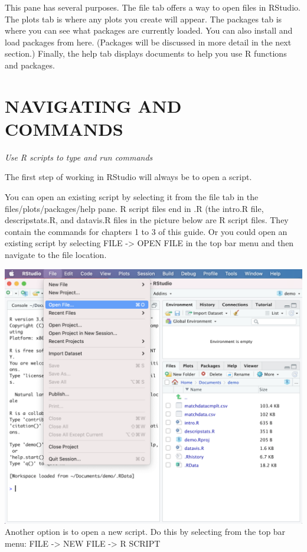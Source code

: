 \documentclass[
]{book}
\begin{document}
This pane has several purposes. The file tab offers a way to open files in RStudio. The plots tab is where any plots you create will appear. The packages tab is where you can see what packages are currently loaded. You can also install and load packages from here. (Packages will be discussed in more detail in the next section.) Finally, the help tab displays documents to help you use R functions and packages.

\hypertarget{navigating-and-commands}{%
\section{NAVIGATING AND COMMANDS}\label{navigating-and-commands}}

\emph{Use R scripts to type and run commands}

The first step of working in RStudio will always be to open a script.

You can open an existing script by selecting it from the file tab in the files/plots/packages/help pane. R script files end in .R (the intro.R file, descripstats.R, and datavis.R files in the picture below are R script files. They contain the commands for chapters 1 to 3 of this guide. Or you could open an existing script by selecting FILE -\textgreater{} OPEN FILE in the top bar menu and then navigate to the file location.

\includegraphics{img/NAVIGATING AND COMMANDS R15.png}\\
Another option is to open a new script. Do this by selecting from the top bar menu: FILE -\textgreater{} NEW FILE -\textgreater{} R SCRIPT
\end{document}
